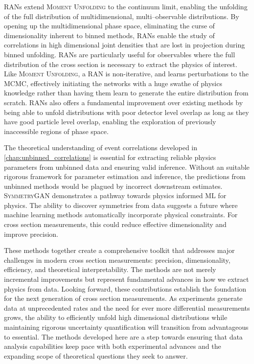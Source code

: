         RANs extend \textsc{Moment Unfolding} to the continuum limit, enabling the unfolding of the full distribution of multidimensional, multi--observable distributions.
        By opening up the multidimensional phase space, eliminating the curse of dimensionality inherent to binned methods, RANs enable the study of correlations in high dimensional joint densities that are lost in projection during binned unfolding.
        RANs are particularly useful for observables where the full distribution of the cross section is necessary to extract the physics of interest.
        Like \textsc{Moment Unfolding}, a RAN is non-iterative, and learns perturbations to the MCMC, effectively initiating the networks with a huge swathe of physics knowledge rather than having them learn to generate the entire distribution from scratch.
        RANs also offers a fundamental improvement over existing methods by being able to unfold distributions with poor detector level overlap as long as they have good particle level overlap, enabling the exploration of previously inaccessible regions of phase space.
        
        The theoretical understanding of event correlations developed in \cref{chap:unbinned_correlations} is essential for extracting reliable physics parameters from unbinned data and ensuring valid inference.
        Without an suitable rigorous framework for parameter estimation and inference, the predictions from unbinned methods would be plagued by incorrect downstream estimates.
        \textsc{SymmetryGAN} demonstrates a pathway towards physics informed ML for physics.
        The ability to discover symmetries from data suggests a future where machine learning methods automatically incorporate physical constraints.
        For cross section measurements, this could reduce effective dimensionality and improve precision.
    
        These methods together create a comprehensive toolkit that addresses major challenges in modern cross section measurements: precision, dimensionality, efficiency, and theoretical interpretability.
        The methods are not merely incremental improvements but represent fundamental advances in how we extract physics from data.
        Looking forward, these contributions establish the foundation for the next generation of cross section measurements.
        As experiments generate data at unprecedented rates and the need for ever more differential measurements grows, the ability to efficiently unfold high dimensional distributions while maintaining rigorous uncertainty quantification will transition from advantageous to essential.
        The methods developed here are a step towards ensuring that data analysis capabilities keep pace with both experimental advances and the expanding scope of theoretical questions they seek to answer.

